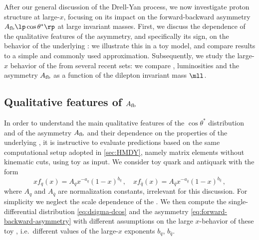 
After our general discussion of the Drell-Yan process,
we now investigate
 proton structure at large-$x$, focusing on its
impact on the forward-backward asymmetry $A_{\rm fb}\lp \cos\theta^*\rp$
at large invariant masses.
%
First, we discuss the dependence of the
qualitative features of the asymmetry,
and specifically its sign, on the behavior of the underlying \pdfs: we
illustrate this in a toy model, and compare results to a simple and 
commonly used approximation.
%
Subsequently,
we study the large-$x$ behavior of the \pdfs from several
recent \pdf sets: we compare \pdfs, luminosities and the \lo asymmetry
$A_{\rm fb}$ as a function of the dilepton invariant mass $\mll$.

\subsection{Qualitative features of \texorpdfstring{$A_{\rm fb}$}{Afb}}
\label{sec:afb_toy}

In order to understand the main qualitative features of  the $\cos\theta^*$
distribution and of the asymmetry $A_{\rm fb}$ and their dependence on the 
properties of the underlying
\pdfs, it is instructive to evaluate predictions based on the
same computational setup adopted in \cref{sec:HMDY}, namely
 \lo matrix elements without kinematic cuts, using toy \pdfs as input.
%
We consider toy quark and antiquark \pdf with  the form
\begin{equation}
  \label{eq:toypdf}
  xf_q(x) = A_qx^{-a_q}(1-x)^{b_q} \, , \quad xf_{\bar{q}}(x) = A_{\bar{q}}x^{-a_{\bar{q}}}(1-x)^{b_{\bar{q}}} \, ,
\end{equation}
where $A_q$ and $A_{\bar{q}}$ are  normalization constants, irrelevant
for this discussion.
%
For simplicity we neglect the scale dependence of
the \pdfs.
%
We then compute the single-differential distribution \cref{eq:dsigma-dcos} and
the asymmetry \cref{eq:forward-backward-asymmetry} with different assumptions on the
large $x$-behavior of these toy \pdfs, i.e.\ different values of the large-$x$
exponents $b_q$, $b_{\bar{q}}$.

